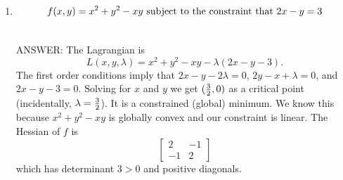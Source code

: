 \documentclass[11pt]{article}
\begin{document}
\begin{enumerate}
\begin{enumerate}
\ \\ANSWER:   There is one critical point: $({1\over \sqrt{2}}, 1, {1\over 2})$.  It is a global optimum because the function is the sum of concave functions of one variable.  No Hessian required.

\item $$f(x, y)=x^2+y^2-xy \hbox{ subject to the constraint that }2x-y=3$$

\ \\ANSWER:  The Lagrangian is $$L(x, y, \lambda)=x^2+y^2-xy-\lambda(2x-y-3).$$  The first order conditions imply that $2x-y-2\lambda=0$, $2y-x+\lambda=0$, and $2x-y-3=0$.  Solving for $x$ and $y$ we get $({3\over 2},0)$ as a critical point (incidentally, $\lambda={3\over 2}$).  It is a constrained (global) minimum.  We know this because $x^2+y^2-xy$ is globally convex and our constraint is linear. The Hessian of $f$ is $$\begin{bmatrix}2& -1\\-1& 2\end{bmatrix}$$ which has determinant $3>0$ and positive diagonals. 
\end{enumerate}

\end{enumerate}
\end{document}
